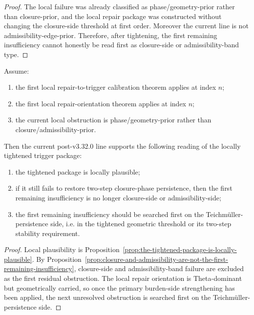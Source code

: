 \begin{proof}
The local failure was already classified as phase/geometry-prior rather than closure-prior, and the local repair package was constructed without changing the closure-side threshold at first order.
Moreover the current line is not admissibility-edge-prior.
Therefore, after tightening, the first remaining insufficiency cannot honestly be read first as closure-side or admissibility-band type.
\end{proof}

\begin{theorem}
\label{thm:first-tightened-package-plausibility-theorem}
Assume:
\begin{enumerate}
    \item the first local repair-to-trigger calibration theorem applies at index $n$;
    \item the first local repair-orientation theorem applies at index $n$;
    \item the current local obstruction is phase/geometry-prior rather than closure/admissibility-prior.
\end{enumerate}
Then the current post-v3.32.0 line supports the following reading of the locally tightened trigger package:
\begin{enumerate}
    \item the tightened package is locally plausible;
    \item if it still fails to restore two-step closure-phase persistence, then the first remaining insufficiency is no longer closure-side or admissibility-side;
    \item the first remaining insufficiency should be searched first on the Teichm\"uller-persistence side, i.e. in the tightened geometric threshold or its two-step stability requirement.
\end{enumerate}
\end{theorem}

\begin{proof}
Local plausibility is Proposition~\ref{prop:the-tightened-package-is-locally-plausible}.
By Proposition~\ref{prop:closure-and-admissibility-are-not-the-first-remaining-insufficiency}, closure-side and admissibility-band failure are excluded as the first residual obstruction.
The local repair orientation is Theta-dominant but geometrically carried, so once the primary burden-side strengthening has been applied, the next unresolved obstruction is searched first on the Teichm\"uller-persistence side.
\end{proof}


